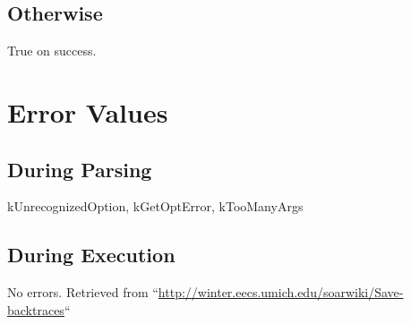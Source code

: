 \documentclass[10pt]{article}
\begin{document}
\subsection*{ Otherwise }


 True on success. 
\section*{ Error Values }
\subsection*{ During Parsing }


 kUnrecognizedOption, kGetOptError, kTooManyArgs
\subsection*{ During Execution }


 No errors.  Retrieved from ``\url{http://winter.eecs.umich.edu/soarwiki/Save-backtraces}``
\end{document}
